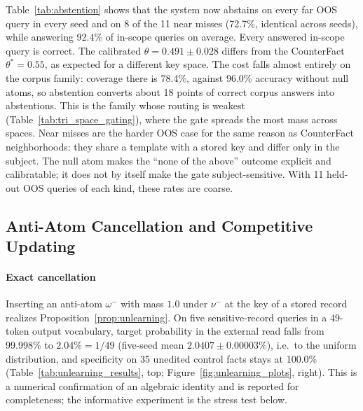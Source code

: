 \documentclass[preprint,12pt]{elsarticle}
\newif\ifmarkchanges
\newcommand{\rev}[1]{\ifmarkchanges{\color{blue}#1}\else#1\fi}
\begin{document}
\rev{Table~\ref{tab:abstention} shows that the system now abstains on every far OOS query in every seed and on 8 of the 11 near misses (72.7\%, identical across seeds), while answering 92.4\% of in-scope queries on average. Every answered in-scope query is correct. The calibrated $\theta=0.491\pm0.028$ differs from the CounterFact $\theta^*=0.55$, as expected for a different key space. The cost falls almost entirely on the corpus family: coverage there is 78.4\%, against 96.0\% accuracy without null atoms, so abstention converts about 18 points of correct corpus answers into abstentions. This is the family whose routing is weakest (Table~\ref{tab:tri_space_gating}), where the gate spreads the most mass across spaces. Near misses are the harder OOS case for the same reason as CounterFact neighborhoods: they share a template with a stored key and differ only in the subject. The null atom makes the ``none of the above'' outcome explicit and calibratable; it does not by itself make the gate subject-sensitive. With 11 held-out OOS queries of each kind, these rates are coarse.}

\subsection{Anti-Atom Cancellation and Competitive Updating}
\label{sec:unlearning}

\paragraph{Exact cancellation}
Inserting an anti-atom $\omega^-$ with mass $1.0$ under $\nu^-$ at the key of a stored record realizes Proposition~\ref{prop:unlearning}. On five sensitive-record queries in a 49-token output vocabulary, target probability in the external read falls from 99.998\% to $2.04\% = 1/49$ (five-seed mean $2.0407\pm0.00003\%$), i.e.\ to the uniform distribution, and specificity on 35 unedited control facts stays at 100.0\% (Table~\ref{tab:unlearning_results}, top; Figure~\ref{fig:unlearning_plots}, right). This is a numerical confirmation of an algebraic identity and is reported for completeness; the informative experiment is the stress test below.
\end{document}
